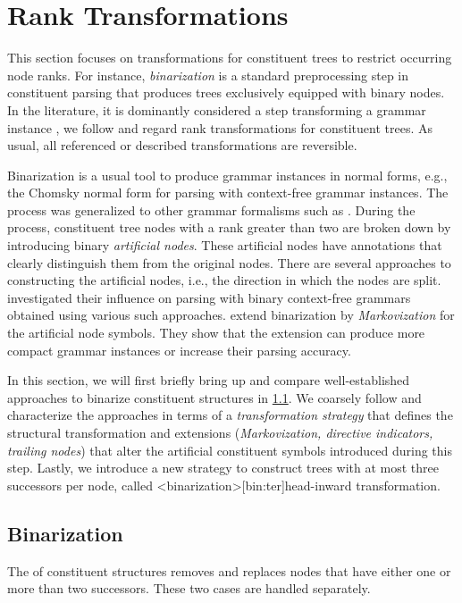 \documentclass[../../document.tex]{subfiles}
\begin{document}
    \section{Rank Transformations}\label{sec:ranktransformations}
    This section focuses on transformations for constituent trees to restrict occurring node ranks.
    For instance, \emph{binarization} is a standard preprocessing step in constituent parsing that produces trees exclusively equipped with binary nodes.
    In the literature, it is dominantly considered a step transforming a grammar instance \citep[e.g.\@][]{KleMan03,Son08,Kal10}, we follow \citet{CraSchBod16} and regard rank transformations for constituent trees.
    As usual, all referenced or described transformations are reversible.

    Binarization is a usual tool to produce grammar instances in normal forms, e.g., the Chomsky normal form for parsing with context-free grammar instances.
    The process was generalized to other grammar formalisms such as  \citep{Kal10, Cra12}.
    During the process, constituent tree nodes with a rank greater than two are broken down by introducing binary \emph{artificial nodes}.
    These artificial nodes have annotations that clearly distinguish them from the original nodes.
    There are several approaches to constructing the artificial nodes, i.e., the direction in which the nodes are split.
     investigated their influence on parsing with binary context-free grammars obtained using various such approaches.
     extend binarization by \emph{Markovization} for the artificial node symbols.
    They show that the extension can produce more compact grammar instances or increase their parsing accuracy.

    In this section, we will first briefly bring up and compare well-established approaches to binarize constituent structures in \cref{sec:binarization}.
    We coarsely follow \citet{Cra12} and characterize the approaches in terms of a \emph{transformation strategy} that defines the structural transformation and extensions (\emph{Markovization, directive indicators, trailing nodes}) that alter the artificial constituent symbols introduced during this step.
    Lastly, we introduce a new strategy to construct trees with at most three successors per node, called <binarization>[bin:ter]{head-inward transformation}.

    \subsection{Binarization}\label{sec:binarization}
    The  of constituent structures removes and replaces nodes that have either one or more than two successors.
    These two cases are handled separately.
\end{document}
